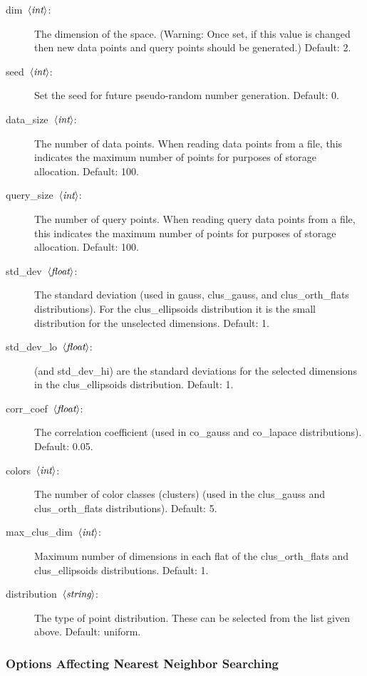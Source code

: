 \documentclass[11pt]{article}		%
\newcommand\ang[1]{\langle #1\rangle}
\newcommand{\STRING}[0]{$\ang{\textit{string}\/}$}
\newcommand{\INT}[0]{$\ang{\textit{int}\/}$}
\newcommand{\FLOAT}[0]{$\ang{\textit{float}\/}$}
\begin{document}
\begin{description}
\item[\hbox{\sf dim \INT:}]
	The dimension of the space. (Warning: Once set, if this value
	is changed then new data points and query points should be
	generated.)  Default: 2.
\item[\hbox{\sf seed \INT:}]
	Set the seed for future pseudo-random number generation.  Default: 0.
\item[\hbox{\sf data\_size \INT:}]
	The number of data points.  When reading data points from a file,
	this indicates the maximum number of points for purposes of storage
	allocation.  Default: 100.
\item[\hbox{\sf query\_size \INT:}]
	The number of query points.  When reading query data points from a
	file, this indicates the maximum number of points for purposes
	of storage allocation.  Default: 100.
\item[\hbox{\sf std\_dev \FLOAT:}]
	The standard deviation (used in \textsf{gauss}, \textsf{clus\_gauss},
	and \textsf{clus\_orth\_flats} distributions).  For the
	\textsf{clus\_ellipsoids} distribution it is the small distribution
	for the unselected dimensions.  Default: 1.
\item[\hbox{\sf std\_dev\_lo \FLOAT:}] (and \textsf{std\_dev\_hi}) are the
	standard deviations for the selected dimensions in the
	\textsf{clus\_ellipsoids} distribution.  Default: 1.
\item[\hbox{\sf corr\_coef \FLOAT:}]
	The correlation coefficient (used in \textsf{co\_gauss} and
	\textsf{co\_lapace} distributions). Default: 0.05.
\item[\hbox{\sf colors \INT:}]
	The number of color classes (clusters) (used in the \textsf{clus\_gauss}
	and \textsf{clus\_orth\_flats} distributions).  Default: 5.
\item[\hbox{\sf max\_clus\_dim \INT:}]
	Maximum number of dimensions in each flat of the \textsf{clus\_orth\_flats} 
	and \textsf{clus\_ellipsoids} distributions.  Default: 1.
\item[\hbox{\sf distribution \STRING:}]
	The type of point distribution.  These can be selected from the
	list given above.  Default: \textsf{uniform}.
\end{description}

\subsubsection{Options Affecting Nearest Neighbor Searching}
\end{document}
